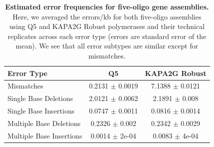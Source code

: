 \documentclass[twocolumn]{article}
\begin{document}
\begin{table}
\centering
\caption{\small \textbf{Estimated error frequencies for five-oligo gene assemblies.} Here, we averaged the errors/kb for both five-oligo assemblies using Q5 and KAPA2G Robust polymerases and their technical replicates across each error type (errors are standard error of the mean). We see that all error subtypes are similar except for mismatches.}
\begin{tabular}{@{}lcc@{}}
\toprule
\textbf{Error Type}      & \textbf{Q5}     & \textbf{KAPA2G Robust} \\ \midrule
Mismatches               & 0.2131 $\pm$ 0.0019 & 7.1388 $\pm$ 0.0121        \\
Single Base Deletions    & 2.0121 $\pm$ 0.0062 & 2.1891 $\pm$ 0.008         \\
Single Base Insertions   & 0.0747 $\pm$ 0.0011 & 0.0816 $\pm$ 0.0014        \\
Multiple Base Deletions  & 0.2326 $\pm$ 0.002  & 0.2342 $\pm$ 0.0029        \\
Multiple Base Insertions & 0.0014 $\pm$ 2e-04  & 0.0083 $\pm$ 4e-04         \\ \bottomrule
\end{tabular}
\end{table}
\end{document}
